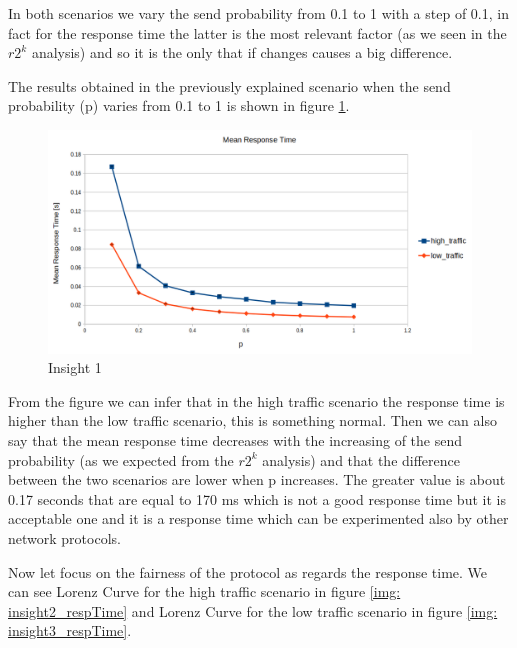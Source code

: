\noindent In both scenarios we vary the send probability from 0.1 to 1 with a step of 0.1, in fact for the response time the latter is the most relevant factor (as we seen in the $r2^k$ analysis) and so it is the only that if changes causes a big difference.

\noindent The results obtained in the previously explained scenario when the send probability (p) varies from 0.1 to 1 is shown in figure \ref{img: insight1_respTime}.
\begin{figure}[H]
	\centering
	\includegraphics[width=\textwidth]{img/MeanResponseTimeInsight.png}
	\caption{Insight 1}
	\label{img: insight1_respTime}
\end{figure}

\noindent From the figure we can infer that in the high traffic scenario the response time is higher than the low traffic scenario, this is something normal. Then we can also say that the mean response time decreases with the increasing of the send probability (as we expected from the $r2^k$ analysis) and that the difference between the two scenarios are lower when p increases. The greater value is about 0.17 seconds that are equal to 170 ms which is not a good response time but it is acceptable one and it is a response time which can be experimented also by other network protocols.

\noindent Now let focus on the fairness of the protocol as regards the response time. We can see Lorenz Curve for the high traffic scenario in figure \ref{img: insight2_respTime} and Lorenz Curve for the low traffic scenario in figure \ref{img: insight3_respTime}.

